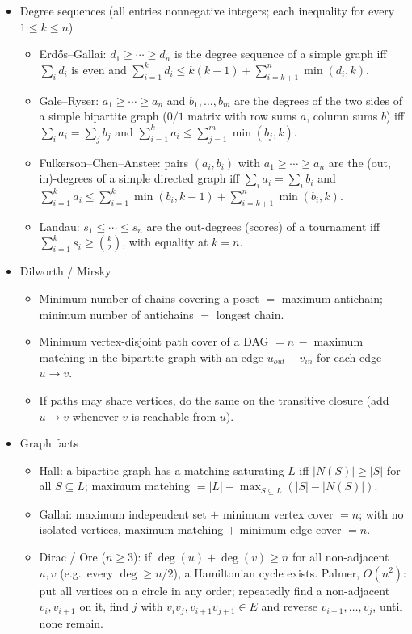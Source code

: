 \begin{itemize}
\item Degree sequences (all entries nonnegative integers; each inequality for every $1 \le k \le n$)
\begin{itemize}
  \item Erdős–Gallai: $d_1 \ge \cdots \ge d_n$ is the degree sequence of a simple graph iff $\sum_i d_i$ is even and $\displaystyle\sum_{i=1}^k d_i \le k(k-1) + \displaystyle\sum_{i=k+1}^n \min(d_i, k)$.
  \item Gale–Ryser: $a_1 \ge \cdots \ge a_n$ and $b_1, \ldots, b_m$ are the degrees of the two sides of a simple bipartite graph ($0/1$ matrix with row sums $a$, column sums $b$) iff $\sum_i a_i = \sum_j b_j$ and $\displaystyle\sum_{i=1}^k a_i \le \displaystyle\sum_{j=1}^m \min(b_j, k)$.
  \item Fulkerson–Chen–Anstee: pairs $(a_i, b_i)$ with $a_1 \ge \cdots \ge a_n$ are the (out, in)-degrees of a simple directed graph iff $\sum_i a_i = \sum_i b_i$ and $\displaystyle\sum_{i=1}^k a_i \le \displaystyle\sum_{i=1}^k \min(b_i, k-1) + \displaystyle\sum_{i=k+1}^n \min(b_i, k)$.
  \item Landau: $s_1 \le \cdots \le s_n$ are the out-degrees (scores) of a tournament iff $\displaystyle\sum_{i=1}^k s_i \ge \binom{k}{2}$, with equality at $k = n$.
\end{itemize}

\item Dilworth / Mirsky

\begin{itemize}
  \item Minimum number of chains covering a poset $=$ maximum antichain; minimum number of antichains $=$ longest chain.
  \item Minimum vertex-disjoint path cover of a DAG $= n\, -$ maximum matching in the bipartite graph with an edge $u_{out} - v_{in}$ for each edge $u \to v$.
  \item If paths may share vertices, do the same on the transitive closure (add $u \to v$ whenever $v$ is reachable from $u$).
\end{itemize}

\item Graph facts

\begin{itemize}
  \item Hall: a bipartite graph has a matching saturating $L$ iff $|N(S)| \ge |S|$ for all $S \subseteq L$; maximum matching $= |L| - \max_{S \subseteq L} (|S| - |N(S)|)$.
  \item Gallai: maximum independent set $+$ minimum vertex cover $= n$; with no isolated vertices, maximum matching $+$ minimum edge cover $= n$.
  \item Dirac / Ore ($n \ge 3$): if $\deg(u) + \deg(v) \ge n$ for all non-adjacent $u, v$ (e.g.\ every $\deg \ge n/2$), a Hamiltonian cycle exists. Palmer, $O(n^2)$: put all vertices on a circle in any order; repeatedly find a non-adjacent $v_i, v_{i+1}$ on it, find $j$ with $v_i v_j, v_{i+1} v_{j+1} \in E$ and reverse $v_{i+1}, \ldots, v_j$, until none remain.
\end{itemize}


\end{itemize}
